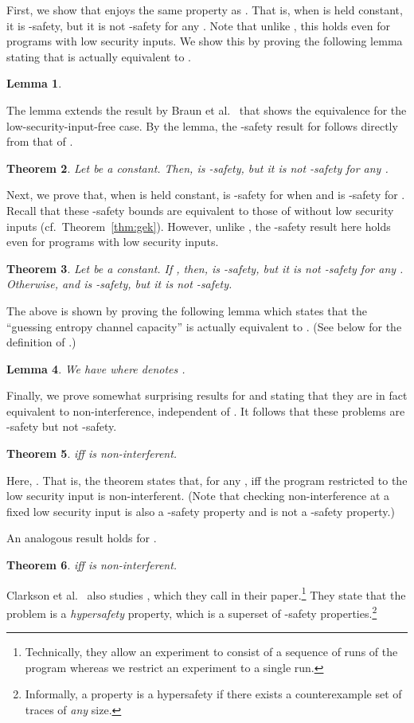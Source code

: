 \documentclass{llncs}
\newtheorem{theorem}{Theorem}[section]
\newtheorem{lemma}[theorem]{Lemma}
\begin{document}
First, we show that  enjoys the same property as .  That is, when  is held constant, it is
-safety, but it is not -safety for any .  Note that unlike , this holds even
for programs with low security inputs.  We show this by proving the
following lemma stating that  is actually
equivalent to .
\begin{lemma}
\label{lem:mecceqcc}

\end{lemma}
The lemma extends the result by Braun et al.~\cite{Braun:09:MFPS} that
shows the equivalence for the low-security-input-free case.  By the
lemma, the -safety result for  follows directly from
that of .
\begin{theorem}\label{thm:mecck}
  Let  be a constant.  Then,  is
  -safety, but it is not -safety for any .
\end{theorem}

Next, we prove that, when  is held constant,  is
-safety for  when  and is
-safety for .  Recall that these -safety bounds
are equivalent to those of  without low security inputs
(cf.~Theorem~\ref{thm:gek}).  However, unlike , the
-safety result here holds even for programs with low security
inputs.
\begin{theorem}\label{thm:gecck}
  Let  be a constant.  If , then, 
  is -safety, but it is not -safety for any .  Otherwise,  and  is
  -safety, but it is not -safety.
\end{theorem}
\begin{sloppypar}
The above is shown by proving the following lemma which states that the
``guessing entropy channel capacity''  is
actually equivalent to .
(See below for the definition of .)
\end{sloppypar}
\begin{lemma}
\label{lem:gecc}
We have  where  denotes .
\end{lemma}

Finally, we prove somewhat surprising results for  and  stating that they are in fact
equivalent to non-interference, independent of .  It follows that
these problems are -safety but not -safety.
\begin{theorem}
\label{thm:be3ni}
 iff  is non-interferent.
\end{theorem}
Here, .  That is, the theorem states
that, for any ,  iff the
program  restricted to the low security input  is
non-interferent. (Note that checking non-interference at a fixed low
security input is also a -safety property and is not a -safety
property.)

An analogous result holds for .
\begin{theorem}
\label{thm:be4ni}
 iff  is non-interferent.
\end{theorem}
Clarkson et al.~\cite{DBLP:conf/csfw/ClarksonS08} also studies , which they call  in their paper.\footnote{Technically,
  they allow an experiment to consist of a sequence of runs of the
  program whereas we restrict an experiment to a single run.}  They
state that the problem is a {\em hypersafety} property, which is a
superset of -safety properties.\footnote{Informally, a property is
  a hypersafety if there exists a counterexample set of traces of {\em
    any} size.}
\end{document}
